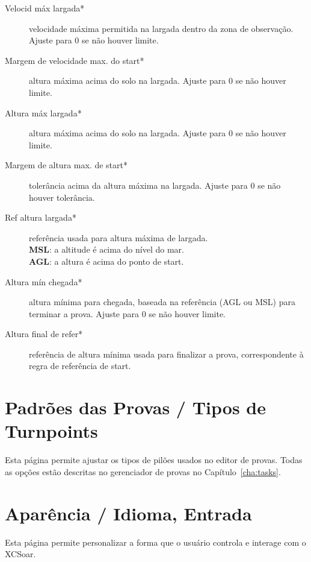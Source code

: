 \begin{description}
\item[Velocid máx largada*]  velocidade máxima permitida na largada dentro da zona de observação.  Ajuste para 0 se não houver limite.
\item[Margem de velocidade max. do start*] altura máxima acima do solo na largada.  Ajuste para 0 se não houver limite.
\item[Altura máx largada*]  altura máxima acima do solo na largada.  Ajuste para 0 se não houver limite.
\item[Margem de altura max. de start*]  tolerância acima da altura máxima na largada.  Ajuste para 0 se não houver tolerância.
\item[Ref altura largada*]  referência usada para altura máxima de largada. \\
  {\bf MSL}: a altitude é acima do nível do mar. \\
  {\bf AGL}: a altura é acima do ponto de start.
\item[Altura mín chegada*]  altura mínima para chegada, baseada na referência (AGL ou MSL) para terminar a prova.  Ajuste para 0 se não houver limite.
\item[Altura final de refer*]  referência de altura mínima usada para finalizar a prova, correspondente à regra de referência de start.
\end{description}


\section{Padrões das Provas / Tipos de Turnpoints}

Esta página permite ajustar os tipos de pilões usados no editor de provas.  Todas as opções estão descritas no gerenciador de provas no Capítulo~\ref{cha:tasks}.


\section{Aparência / Idioma, Entrada}\label{sec:interface}

Esta página permite personalizar a forma que o usuário controla e interage com o XCSoar.

